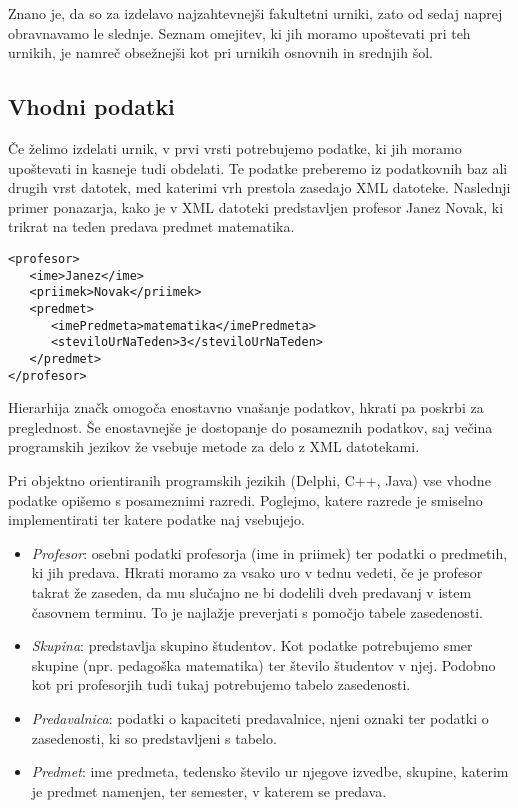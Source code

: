 \documentclass[a4paper,10pt]{article}
\begin{document}
Znano je, da so za izdelavo najzahtevnejši fakultetni urniki, zato od sedaj naprej obravnavamo le slednje. Seznam omejitev, ki jih moramo upoštevati pri teh urnikih, je namreč obsežnejši kot pri urnikih osnovnih in srednjih šol.
\subsection{Vhodni podatki}
Če želimo izdelati urnik, v prvi vrsti potrebujemo podatke, ki jih moramo upoštevati in kasneje tudi obdelati. Te podatke preberemo iz podatkovnih baz ali drugih vrst datotek, med katerimi vrh prestola zasedajo XML datoteke. Naslednji primer ponazarja, kako je v XML datoteki predstavljen profesor Janez Novak, ki trikrat na teden predava predmet matematika.

\begin{verbatim}
<profesor>
   <ime>Janez</ime>
   <priimek>Novak</priimek>
   <predmet>
      <imePredmeta>matematika</imePredmeta>
      <steviloUrNaTeden>3</steviloUrNaTeden>
   </predmet>
</profesor>
\end{verbatim}

Hierarhija značk omogoča enostavno vnašanje podatkov, hkrati pa poskrbi za preglednost. Še enostavnejše je dostopanje do posameznih podatkov, saj večina programskih jezikov že vsebuje metode za delo z XML datotekami.

Pri objektno orientiranih programskih jezikih (Delphi, C++, Java) vse vhodne podatke opišemo s posameznimi razredi. Poglejmo, katere razrede je smiselno implementirati ter katere podatke naj vsebujejo.

\begin{itemize}
    \item \emph{Profesor}: osebni podatki profesorja (ime in priimek) ter podatki o predmetih, ki jih predava. Hkrati moramo za vsako uro v tednu vedeti, če je profesor takrat že zaseden, da mu slučajno ne bi dodelili dveh predavanj v istem časovnem terminu. To je najlažje preverjati s pomočjo tabele zasedenosti.
    \item \emph{Skupina}: predstavlja skupino študentov. Kot podatke potrebujemo smer skupine (npr. pedagoška matematika) ter število študentov v njej. Podobno kot pri profesorjih tudi tukaj potrebujemo tabelo zasedenosti.
    \item \emph{Predavalnica}: podatki o kapaciteti predavalnice, njeni oznaki ter podatki o zasedenosti, ki so predstavljeni s tabelo.
    \item \emph{Predmet}: ime predmeta, tedensko število ur njegove izvedbe, skupine, katerim je predmet namenjen, ter semester, v katerem se predava.
\end{itemize}
\end{document}
